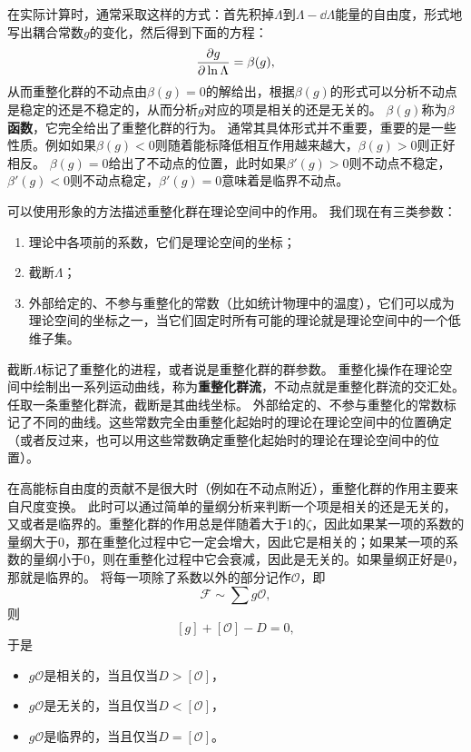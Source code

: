 \documentclass[hyperref, UTF8, a4paper]{ctexart}
\begin{document}
在实际计算时，通常采取这样的方式：首先积掉$\Lambda$到$\Lambda - \dd{\Lambda}$能量的自由度，形式地写出耦合常数$g$的变化，然后得到下面的方程：
\begin{equation}
    \pdv{g}{\ln \Lambda} = \beta(g),
\end{equation}
从而重整化群的不动点由$\beta(g)=0$的解给出，根据$\beta(g)$的形式可以分析不动点是稳定的还是不稳定的，从而分析$g$对应的项是相关的还是无关的。
$\beta(g)$称为\textbf{$\beta$函数}，它完全给出了重整化群的行为。
通常其具体形式并不重要，重要的是一些性质。例如如果$\beta(g) < 0$则随着能标降低相互作用越来越大，$\beta(g) > 0$则正好相反。
$\beta(g) = 0$给出了不动点的位置，此时如果$\beta'(g) > 0$则不动点不稳定，$\beta'(g) < 0$则不动点稳定，$\beta'(g) = 0$意味着是临界不动点。

可以使用形象的方法描述重整化群在理论空间中的作用。
我们现在有三类参数：
\begin{enumerate}
    \item 理论中各项前的系数，它们是理论空间的坐标；
    \item 截断$\Lambda$；
    \item 外部给定的、不参与重整化的常数（比如统计物理中的温度），它们可以成为理论空间的坐标之一，当它们固定时所有可能的理论就是理论空间中的一个低维子集。
\end{enumerate}
截断$\Lambda$标记了重整化的进程，或者说是重整化群的群参数。
重整化操作在理论空间中绘制出一系列运动曲线，称为\textbf{重整化群流}，不动点就是重整化群流的交汇处。
任取一条重整化群流，截断是其曲线坐标。
外部给定的、不参与重整化的常数标记了不同的曲线。这些常数完全由重整化起始时的理论在理论空间中的位置确定（或者反过来，也可以用这些常数确定重整化起始时的理论在理论空间中的位置）。

在高能标自由度的贡献不是很大时（例如在不动点附近），重整化群的作用主要来自尺度变换。
此时可以通过简单的量纲分析来判断一个项是相关的还是无关的，又或者是临界的。重整化群的作用总是伴随着大于1的$\zeta$，因此如果某一项的系数的量纲大于$0$，那在重整化过程中它一定会增大，因此它是相关的；如果某一项的系数的量纲小于$0$，则在重整化过程中它会衰减，因此是无关的。如果量纲正好是$0$，那就是临界的。
将每一项除了系数以外的部分记作$\mathcal{O}$，即
\[
    \mathcal{F} \sim \sum g \mathcal{O},
\]
则
\[
    [g] + [\mathcal{O}] - D = 0,
\]
于是
\begin{itemize}
    \item $g \mathcal{O}$是相关的，当且仅当$D > [\mathcal{O}]$，
    \item $g \mathcal{O}$是无关的，当且仅当$D < [\mathcal{O}]$，
    \item $g \mathcal{O}$是临界的，当且仅当$D = [\mathcal{O}]$。
\end{itemize}
\end{document}
